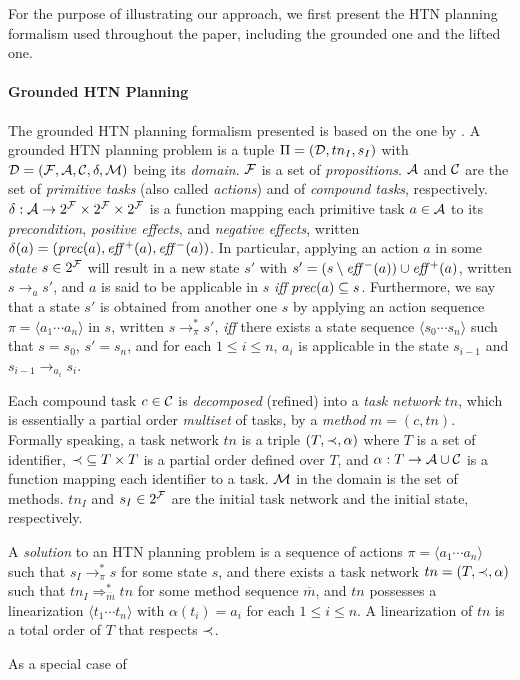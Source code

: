 For the purpose of illustrating our approach, we first present the HTN planning formalism used throughout the paper, including the grounded one and the lifted one. %

\paragraph{Grounded HTN Planning} The grounded HTN planning formalism presented is based on the one by . A grounded HTN planning problem is a tuple $\Pi{} = (\mathcal{D}{}, tn_{I}, s_{I})$ with $\mathcal{D}{} = (\mathcal{F}{}, \mathcal{A}{}, \mathcal{C}{}, \delta, \mathcal{M}{})$ being its \emph{domain}. $\mathcal{F}{}$ is a set of \emph{propositions}. $\mathcal{A}{}$ and $\mathcal{C}{}$ are the set of \emph{primitive tasks} (also called \emph{actions}) and of \emph{compound tasks}, respectively. $\delta: \mathcal{A}{} \to 2^{\mathcal{F}{}} \times 2^{\mathcal{F}{}} \times 2^{\mathcal{F}{}}$ is a function mapping each primitive task $a \in \mathcal{A}{}$ to its \emph{precondition}, \emph{positive effects}, and \emph{negative effects}, written $\delta(a) = (\mathit{prec}(a), \mathit{eff}{}^{+}(a), \mathit{eff}{}^{-}(a))$. In particular, applying an action $a$ in some \emph{state} $s \in 2^{\mathcal{F}{}}$ will result in a new state $s'$ with $s' = (s \setminus \mathit{eff}{}^{-}(a)) \cup \mathit{eff}{}^{+}(a)$, written $s \to_{a} s'$, and $a$ is said to be applicable in $s$ \emph{iff} $\mathit{prec}(a) \subseteq s$. Furthermore, we say that a state $s'$ is obtained from another one $s$ by applying an action sequence $\pi = \langle a_{1} \cdots a_{n} \rangle$ in $s$, written $s \to^{\ast}_{\pi} s'$, \emph{iff} there exists a state sequence $\langle s_{0} \cdots s_{n} \rangle$ such that $s = s_{0}$, $s' = s_{n}$, and for each $1 \leq i \leq n$, $a_{i}$ is applicable in the state $s_{i - 1}$ and $s_{i - 1} \to_{a_{i}} s_{i}$. 

Each compound task $c \in \mathcal{C}{}$ is \emph{decomposed} (refined) into a \emph{task network} $tn$, which is essentially a partial order \emph{multiset} of tasks, by a \emph{method} $m = (c, tn)$. Formally speaking, a task network $tn$ is a triple $(T, \mathord{\prec}{}, \alpha)$ where $T$ is a set of identifier, $\mathord{\prec}{} \subseteq T \times T$ is a partial order defined over $T$, and $\alpha: T \to \mathcal{A}{} \cup \mathcal{C}{}$ is a function mapping each identifier to a task. $\mathcal{M}{}$ in the domain is the set of methods. $tn_{I}$ and $s_{I} \in 2^{\mathcal{F}{}}$ are the initial task network and the initial state, respectively.


A \emph{solution} to an HTN planning problem is a sequence of actions $\pi = \langle a_{1} \cdots a_{n} \rangle$ such that $s_{I} \to^{\ast}_{\pi} s$ for some state $s$, and there exists a task network $tn = (T, \mathord{\prec}{}, \alpha)$ such that $tn_{I} \Rightarrow^{\ast}_{\overline{m}} tn$ for some method sequence $\overline{m}$, and $tn$ possesses a linearization $\langle t_{1} \cdots t_{n} \rangle$ with $\alpha(t_{i}) = a_{i}$ for each $1 \leq i \leq n$. A linearization of $tn$ is a total order of $T$ that respects $\mathord{\prec}{}$.

As a special case of 